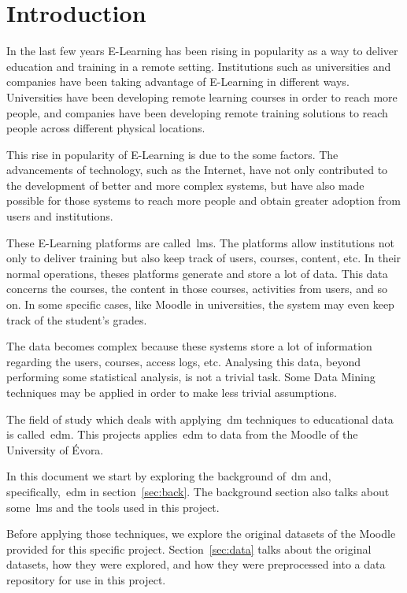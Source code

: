 \chapter{Introduction}

In the last few years E-Learning has been rising in popularity as a way to
deliver education and training in a remote setting. Institutions such as
universities and companies have been taking advantage of E-Learning in
different ways. Universities have been developing remote learning courses in
order to reach more people, and companies have been developing remote training
solutions to reach people across different physical locations.

This rise in popularity of E-Learning is due to the some factors. The
advancements of technology, such as the Internet, have not only contributed to
the development of better and more complex systems, but have also made possible
for those systems to reach more people and obtain greater adoption from users
and institutions.

These E-Learning platforms are called~\gls{lms}. The platforms
allow institutions not only to deliver training but also keep track of users,
courses, content, etc. In their normal operations, theses platforms generate
and store a lot of data. This data concerns the courses, the content in those
courses, activities from users, and so on. In some specific cases, like Moodle
in universities, the system may even keep track of the student's grades.

The data becomes complex because these systems store a lot of information
regarding the users, courses, access logs, etc. Analysing this data, beyond
performing some statistical analysis, is not a trivial task. Some Data Mining
techniques may be applied in order to make less trivial assumptions.

The field of study which deals with applying~\gls{dm} techniques to educational
data is called~\gls{edm}. This projects applies~\gls{edm} to data from the
Moodle of the University of Évora.~\cite{ind_010, ind_011, ind_013, ind_014,
ind_015}

In this document we start by exploring the background of~\gls{dm} and,
specifically,~\gls{edm} in section~\ref{sec:back}. The background section also
talks about some~\gls{lms} and the tools used in this project.

Before applying those techniques, we explore the original datasets of the
Moodle provided for this specific project. Section~\ref{sec:data} talks about
the original datasets, how they were explored, and how they were preprocessed
into a data repository for use in this project.

